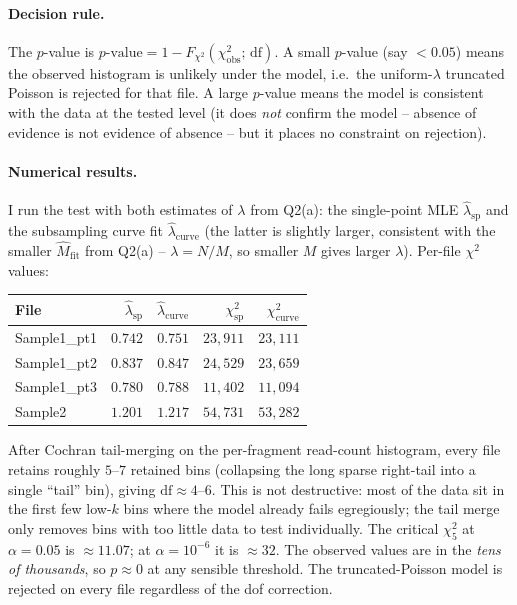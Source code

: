 \documentclass[11pt,a4paper]{article}
\newcommand{\hlam}{\hat{\lambda}}
\newcommand{\hM}{\hat{M}}
\begin{document}
\paragraph{Decision rule.}
The $p$-value is
$p\text{-value} = 1 - F_{\chi^{2}}(\chi^{2}_{\text{obs}};\, \mathrm{df})$. A small
$p$-value (say $< 0.05$) means the observed histogram is unlikely under the model,
i.e.\ the uniform-$\lambda$ truncated Poisson is rejected for that file. A large
$p$-value means the model is consistent with the data at the tested level (it does
\emph{not} confirm the model -- absence of evidence is not evidence of absence -- but
it places no constraint on rejection).

\paragraph{Numerical results.}
I run the test with both estimates of $\lambda$ from Q2(a): the single-point MLE
$\hlam_{\text{sp}}$ and the subsampling curve fit $\hlam_{\text{curve}}$ (the latter
is slightly larger, consistent with the smaller $\hM_{\text{fit}}$ from Q2(a) --
$\lambda = N/M$, so smaller $M$ gives larger $\lambda$). Per-file $\chi^{2}$ values:

\begin{center}
\renewcommand{\arraystretch}{1.2}
\begin{tabular}{lrrrr}
\textbf{File} & \textbf{$\hlam_{\text{sp}}$} & \textbf{$\hlam_{\text{curve}}$} &
\textbf{$\chi^{2}_{\text{sp}}$} & \textbf{$\chi^{2}_{\text{curve}}$} \\\hline
Sample1\_pt1 & $0.742$ & $0.751$ & $23{,}911$ & $23{,}111$ \\
Sample1\_pt2 & $0.837$ & $0.847$ & $24{,}529$ & $23{,}659$ \\
Sample1\_pt3 & $0.780$ & $0.788$ & $11{,}402$ & $11{,}094$ \\
Sample2      & $1.201$ & $1.217$ & $54{,}731$ & $53{,}282$ \\
\end{tabular}
\end{center}

After Cochran tail-merging on the per-fragment read-count histogram, every file
retains roughly $5$--$7$ retained bins (collapsing the long sparse right-tail
into a single ``tail'' bin), giving $\mathrm{df} \approx 4$--$6$. This is not
destructive: most of the data sit in the first few low-$k$ bins where the model
already fails egregiously; the tail merge only removes bins with too little
data to test individually. The critical $\chi^{2}_{5}$ at $\alpha = 0.05$ is
$\approx 11.07$; at $\alpha = 10^{-6}$ it is $\approx 32$. The observed values
are in the \emph{tens of thousands}, so $p \approx 0$ at any sensible
threshold. The truncated-Poisson model is rejected on every file regardless of
the dof correction.
\end{document}
